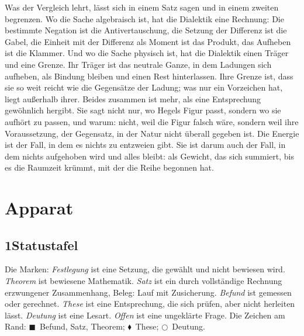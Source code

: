 \documentclass[11pt,a4paper]{article}
\newcommand{\EB}{\textcolor{befund}{$\blacksquare$}}
\newcommand{\EE}{\textcolor{entspr}{$\blacklozenge$}}
\newcommand{\EL}{\textcolor{lesart}{$\bigcirc$}}
\begin{document}
Was der Vergleich lehrt, lässt sich in einem Satz sagen und in einem zweiten begrenzen. Wo die Sache algebraisch ist, hat die Dialektik eine Rechnung: Die bestimmte Negation ist die Antivertauschung, die Setzung der Differenz ist die Gabel, die Einheit mit der Differenz als Moment ist das Produkt, das Aufheben ist die Klammer. Und wo die Sache physisch ist, hat die Dialektik einen Träger und eine Grenze. Ihr Träger ist das neutrale Ganze, in dem Ladungen sich aufheben, als Bindung bleiben und einen Rest hinterlassen. Ihre Grenze ist, dass sie so weit reicht wie die Gegensätze der Ladung; was nur ein Vorzeichen hat, liegt außerhalb ihrer. Beides zusammen ist mehr, als eine Entsprechung gewöhnlich hergibt. Sie sagt nicht nur, wo Hegels Figur passt, sondern wo sie aufhört zu passen, und warum: nicht, weil die Figur falsch wäre, sondern weil ihre Voraussetzung, der Gegensatz, in der Natur nicht überall gegeben ist. Die Energie ist der Fall, in dem es nichts zu entzweien gibt. Sie ist darum auch der Fall, in dem nichts aufgehoben wird und alles bleibt: als Gewicht, das sich summiert, bis es die Raumzeit krümmt, mit der die Reihe begonnen hat.

\newpage
\section*{Apparat}

\subsection*{1\quad Statustafel}

Die Marken: \emph{Festlegung} ist eine Setzung, die gewählt und nicht bewiesen wird. \emph{Theorem} ist bewiesene Mathematik. \emph{Satz} ist ein durch vollständige Rechnung erzwungener Zusammenhang, Beleg: Lauf mit Zusicherung. \emph{Befund} ist gemessen oder gerechnet. \emph{These} ist eine Entsprechung, die sich prüfen, aber nicht herleiten lässt. \emph{Deutung} ist eine Lesart. \emph{Offen} ist eine ungeklärte Frage. Die Zeichen am Rand: \EB\ Befund, Satz, Theorem; \EE\ These; \EL\ Deutung.
\end{document}
